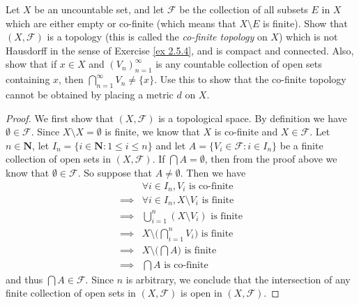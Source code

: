 \begin{exercise}\label{ex 2.5.6}
    Let \(X\) be an uncountable set, and let \(\mathcal{F}\) be the collection of all subsets \(E\) in \(X\) which are either empty or co-finite (which means that \(X \setminus E\) is finite).
    Show that \((X, \mathcal{F})\) is a topology (this is called the \emph{co-finite topology} on \(X\)) which is not Hausdorff in the sense of Exercise \ref{ex 2.5.4}, and is compact and connected.
    Also, show that if \(x \in X\) and \((V_n)_{n = 1}^\infty\) is any countable collection of open sets containing \(x\), then \(\bigcap_{n = 1}^\infty V_n \neq \{x\}\).
    Use this to show that the co-finite topology cannot be obtained by placing a metric \(d\) on \(X\).
\end{exercise}

\begin{proof}
    We first show that \((X, \mathcal{F})\) is a topological space.
    By definition we have \(\emptyset \in \mathcal{F}\).
    Since \(X \setminus X = \emptyset\) is finite, we know that \(X\) is co-finite and \(X \in \mathcal{F}\).
    Let \(n \in \mathbf{N}\), let \(I_n = \{i \in \mathbf{N} : 1 \leq i \leq n\}\) and let \(A = \{V_i \in \mathcal{F} : i \in I_n\}\) be a finite collection of open sets in \((X, \mathcal{F})\).
    If \(\bigcap A = \emptyset\), then from the proof above we know that \(\emptyset \in \mathcal{F}\).
    So suppose that \(A \neq \emptyset\).
    Then we have
    \begin{align*}
                 & \forall i \in I_n, V_i \text{ is co-finite}                     \\
        \implies & \forall i \in I_n, X \setminus V_i \text{ is finite}            \\
        \implies & \bigcup_{i = 1}^n (X \setminus V_i) \text{ is finite}           \\
        \implies & X \setminus \bigg(\bigcap_{i = 1}^n V_i\bigg) \text{ is finite} \\
        \implies & X \setminus \bigg(\bigcap A\bigg) \text{ is finite}             \\
        \implies & \bigcap A \text{ is co-finite}
    \end{align*}
    and thus \(\bigcap A \in \mathcal{F}\).
    Since \(n\) is arbitrary, we conclude that the intersection of any finite collection of open sets in \((X, \mathcal{F})\) is open in \((X, \mathcal{F})\).


\end{proof}
